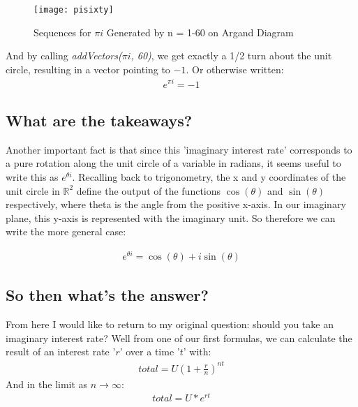 \documentclass[11pt,a4paper]{article}
\begin{document}
\begin{figure}[h]
\begin{center}
\texttt{[image: pisixty]} 
\caption{Sequences for $\pi i$ Generated by n = 1-60 on Argand Diagram}
\end{center}
\end{figure}

And by calling \textit{addVectors($\pi i$, 60)}, we get exactly a 1/2 turn about the unit circle, resulting in a vector pointing to $-1$. Or otherwise written:
\begin{align*}
e^{\pi i} = -1
\end{align*}
\subsection{What are the takeaways?}
Another important fact is that since this 'imaginary interest rate' corresponds to a pure rotation along the unit circle of a variable in radians, it seems useful to write this as $e^{\theta i}$. Recalling back to trigonometry,  the x and y coordinates of the unit circle in $\mathbb{R}^2$ define the output of the functions $\cos(\theta )$ and $\sin(\theta)$ respectively, where theta is the angle from the positive x-axis. In our imaginary plane, this y-axis is represented with the imaginary unit. So therefore we can write the more general case:

\begin{align*}
e^{\theta i} = \cos(\theta ) + i\sin(\theta )
\end{align*}

\subsection{So then what's the answer?}
From here I would like to return to my original question: should you take an imaginary interest rate? Well from one of our first formulas, we can calculate the result of an interest rate '$r$' over a time '$t$' with:
\begin{align*}
total = U \left(  1 + \frac{r}{n} \right)  ^{nt}
\end{align*}
And in the limit as $n \to \infty$:
\begin{align*}
total = U*e^{rt}
\end{align*}
\end{document}
